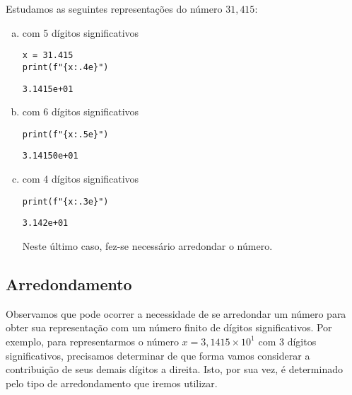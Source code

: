 \begin{ex}
  Estudamos as seguintes representações do número $31,415$:
  \begin{enumerate}[a)]
  \item com 5 dígitos significativos

\begin{lstlisting}
x = 31.415
print(f"{x:.4e}")
\end{lstlisting}

\begin{verbatim}
3.1415e+01
\end{verbatim}

  \item com 6 dígitos significativos

\begin{lstlisting}
print(f"{x:.5e}")
\end{lstlisting}

\begin{verbatim}
3.14150e+01
\end{verbatim}

\item com 4 dígitos significativos

\begin{lstlisting}
print(f"{x:.3e}")
\end{lstlisting}

\begin{verbatim}
3.142e+01
\end{verbatim}

Neste último caso, fez-se necessário arredondar o número.
  \end{enumerate}
\end{ex}

\subsection{Arredondamento}

Observamos que pode ocorrer a necessidade de se arredondar um número para obter sua representação com um número finito de dígitos significativos. Por exemplo, para representarmos o número $x=3,1415\times 10^1$ com 3 dígitos significativos, precisamos determinar de que forma vamos considerar a contribuição de seus demais dígitos a direita. Isto, por sua vez, é determinado pelo tipo de arredondamento que iremos utilizar.

